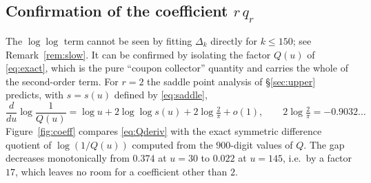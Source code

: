\documentclass[11pt,reqno]{amsart}
\theoremstyle{plain}
\theoremstyle{definition}
\numberwithin{equation}{section}
\begin{document}
\subsection{Confirmation of the coefficient $r\,q_r$}\label{sub:coeff}
The $\log\log$ term cannot be seen by fitting $\Delta_k$ directly for $k\le150$; see
Remark~\ref{rem:slow}. It can be confirmed by isolating the factor $Q(u)$ of
\eqref{eq:exact}, which is the pure ``coupon collector'' quantity and carries the whole of
the second-order term. For $r=2$ the saddle point analysis of \S\ref{sec:upper} predicts,
with $s=s(u)$ defined by \eqref{eq:saddle},
\begin{equation}\label{eq:Qderiv}
  \frac{d}{du}\log\frac1{Q(u)}=\log u+2\log\log s(u)+2\log\tfrac2\pi+o(1),
  \qquad 2\log\tfrac2\pi=-0.9032\ldots
\end{equation}
Figure~\ref{fig:coeff} compares \eqref{eq:Qderiv} with the exact symmetric difference
quotient of $\log(1/Q(u))$ computed from the $900$-digit values of $Q$. The gap decreases
monotonically from $0.374$ at $u=30$ to $0.022$ at $u=145$, i.e.\ by a factor $17$, which
leaves no room for a coefficient other than $2$.
\end{document}

